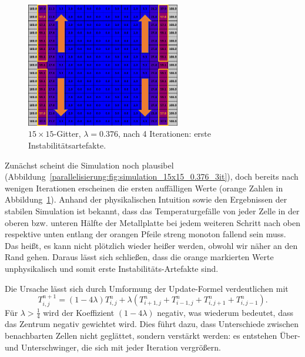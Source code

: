 \begin{figure}[htbp]
	\centering
	\includegraphics[width=0.6\textwidth]{papers/parallelisierung/images/simulation_15x15_0.376_4it.pdf}
	\caption{\(15\times 15\)-Gitter, \(\lambda = 0.376\), nach 4 Iterationen: erste Instabilitätsartefakte.}
	\label{parallelisierung:fig:simulation_15x15_0.376_4it}
\end{figure}

Zunächst scheint die Simulation noch plausibel (Abbildung~\ref{parallelisierung:fig:simulation_15x15_0.376_3it}), doch bereits nach wenigen Iterationen erscheinen die ersten auffälligen Werte (orange Zahlen in Abbildung~\ref{parallelisierung:fig:simulation_15x15_0.376_4it}). Anhand der physikalischen Intuition sowie den Ergebnissen der stabilen Simulation ist bekannt, dass das Temperaturgefälle von jeder Zelle in der oberen bzw. unteren Hälfte der Metallplatte bei jedem weiteren Schritt nach oben respektive unten entlang der orangen Pfeile streng monoton fallend sein muss. Das heißt, es kann nicht plötzlich wieder heißer werden, obwohl wir näher an den Rand gehen. Daraus lässt sich schließen, dass die orange markierten Werte unphysikalisch und somit erste Instabilitäts-Artefakte sind.


Die Ursache lässt sich durch Umformung der Update-Formel verdeutlichen mit
\begin{equation}
	T_{i,j}^{n+1}
	=
	(1-4\lambda)T_{i,j}^n +
	\lambda \left(
	T_{i+1,j}^n + T_{i-1,j}^n + T_{i,j+1}^n + T_{i,j-1}^n
	\right).
\end{equation}
Für \(\lambda > \tfrac14\) wird der Koeffizient \((1-4\lambda)\) negativ, was wiederum bedeutet, dass das Zentrum negativ gewichtet wird.  
Dies führt dazu, dass Unterschiede zwischen benachbarten Zellen nicht geglättet, sondern verstärkt werden: es entstehen Über- und Unterschwinger, die sich mit jeder Iteration vergrößern.

